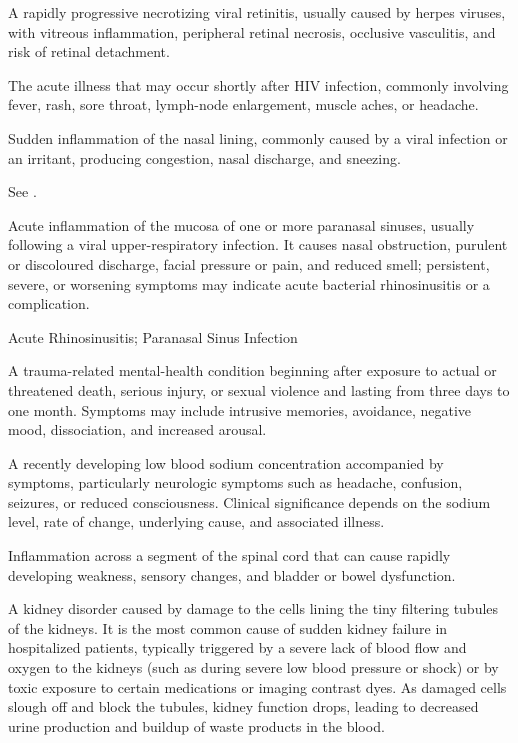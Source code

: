  A rapidly progressive necrotizing viral retinitis, usually caused by herpes viruses, with vitreous inflammation, peripheral retinal necrosis, occlusive vasculitis, and risk of retinal detachment.

 The acute illness that may occur shortly after HIV infection, commonly involving fever, rash, sore throat, lymph-node enlargement, muscle aches, or headache.

 Sudden inflammation of the nasal lining, commonly caused by a viral infection or an irritant, producing congestion, nasal discharge, and sneezing.

 See .

 Acute inflammation of the mucosa of one or more paranasal sinuses, usually following a
viral upper-respiratory infection. It causes nasal obstruction, purulent or discoloured
discharge, facial pressure or pain, and reduced smell; persistent, severe, or worsening
symptoms may indicate acute bacterial rhinosinusitis or a complication.

\synonyms
Acute Rhinosinusitis; Paranasal Sinus Infection

 A trauma-related mental-health condition beginning after exposure to actual or threatened death, serious injury, or sexual violence and lasting from three days to one month. Symptoms may include intrusive memories, avoidance, negative mood, dissociation, and increased arousal.

 A recently developing low blood sodium concentration accompanied by symptoms, particularly neurologic symptoms such as headache, confusion, seizures, or reduced consciousness. Clinical significance depends on the sodium level, rate of change, underlying cause, and associated illness.

 Inflammation across a segment of the spinal cord that can cause rapidly developing weakness, sensory changes, and bladder or bowel dysfunction.

 A kidney disorder caused by damage to the cells lining the tiny filtering tubules of the kidneys. It is the most common cause of sudden kidney failure in hospitalized patients, typically triggered by a severe lack of blood flow and oxygen to the kidneys (such as during severe low blood pressure or shock) or by toxic exposure to certain medications or imaging contrast dyes. As damaged cells slough off and block the tubules, kidney function drops, leading to decreased urine production and buildup of waste products in the blood.

